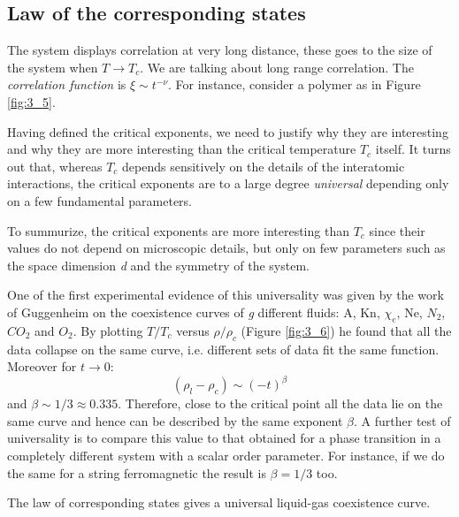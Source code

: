 \documentclass[../main/main.tex]{subfiles}
\begin{document}
\subsection{Law of the corresponding states}
The system displays correlation at very long distance, these goes to the size of the system when \( T \rightarrow T_c \). We are talking about long range correlation. The \emph{correlation function} is \( \xi \sim t^{-\nu } \).
For instance, consider a polymer as in Figure \ref{fig:3_5}.

Having defined the critical exponents, we need to justify why they are interesting and  why they are more interesting than the critical temperature \( T_c \) itself. It turns out that, whereas \( T_c \) depends sensitively on the details of the interatomic interactions, the critical exponents are to a large degree \emph{universal} depending only on a few fundamental parameters.

To summurize, the critical exponents are more interesting than \( T_c \) since their values do not depend on microscopic details, but only on few parameters such as the space dimension \emph{d} and the symmetry of the system.

One of the first experimental evidence of this universality was given by the work of Guggenheim on the coexistence curves of \emph{g} different fluids: A, Kn, $\chi_e$, Ne, $N_2$, $CO_2$ and $O_2$. By plotting \( T/T_c \) versus \( \rho /\rho _c \) (Figure \ref{fig:3_6}) he found that all the data collapse on the same curve, i.e. different sets of data fit the  same function. Moreover for \( t \rightarrow 0 \):
\begin{equation*}
  (\rho _l - \rho _c) \sim (-t)^{\beta}
  \label{eq:}
\end{equation*}
and \( \beta \sim 1/3 \approx 0.335 \).  Therefore, close to the critical point all the data lie on the same curve and hence can be described by the same exponent \( \beta  \).
A further test of universality is to compare this value to that obtained for a phase transition in a completely different system with a scalar order parameter. For instance, if we do the same for a string ferromagnetic the result is \( \beta = 1/3 \)  too.
\begin{remark}
The law of corresponding states gives a universal liquid-gas coexistence curve.
\end{remark}
\end{document}
